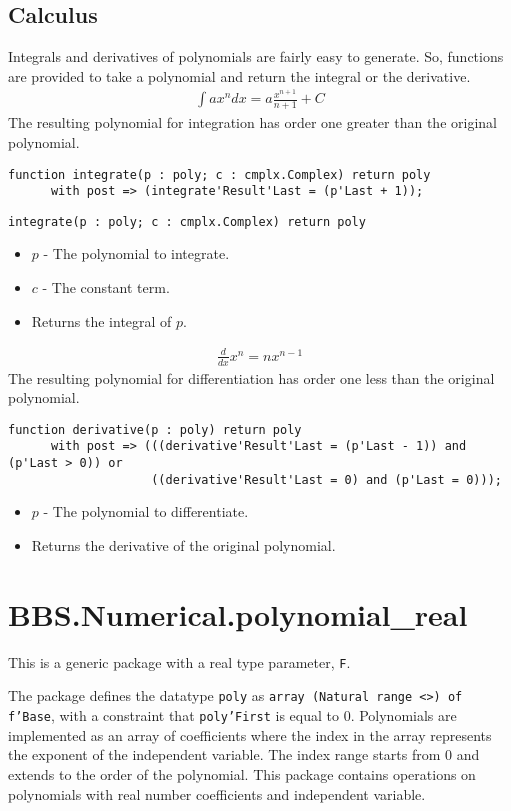 \documentclass[10pt, openany]{book}
\newcommand{\function}[1]{\texttt{#1}}
\newcommand{\datatype}[1]{\texttt{#1}}
\begin{document}
\subsection{Calculus}
Integrals and derivatives of polynomials are fairly easy to generate.  So, functions are provided to take a polynomial and return the integral or the derivative.
\begin{align*}
  \int ax^n dx = a\frac{x^{n+1}}{n+1}+C
\end{align*}
The resulting polynomial for integration has order one greater than the original polynomial.
\begin{lstlisting}
function integrate(p : poly; c : cmplx.Complex) return poly
      with post => (integrate'Result'Last = (p'Last + 1));
\end{lstlisting}
\function{integrate(p : poly; c : cmplx.Complex) return poly}
\begin{itemize}
  \item $p$ - The polynomial to integrate.
  \item $c$ - The constant term.
  \item Returns the integral of $p$.
\end{itemize}

\begin{align*}
  \frac{d}{dx}x^n = n x^{n-1}
\end{align*}
The resulting polynomial for differentiation has order one less than the original polynomial.
\begin{lstlisting}
function derivative(p : poly) return poly
      with post => (((derivative'Result'Last = (p'Last - 1)) and (p'Last > 0)) or
                    ((derivative'Result'Last = 0) and (p'Last = 0)));
\end{lstlisting}
\begin{itemize}
  \item $p$ - The polynomial to differentiate.
  \item Returns the derivative of the original polynomial.
\end{itemize}

\section{BBS.Numerical.polynomial\_real}
This is a generic package with a real type parameter, \datatype{F}.

The package defines the datatype \datatype{poly} as \datatype{array (Natural range  <>) of f'Base}, with a constraint that \datatype{poly'First} is equal to 0.  Polynomials are implemented as an array of coefficients where the index in the array represents the exponent of the independent variable.  The index range starts from 0 and extends to the order of the polynomial.  This package contains operations on polynomials with real number coefficients and independent variable.
\end{document}
